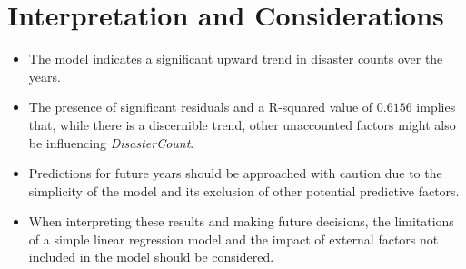 \documentclass[11pt]{article}\usepackage[]{graphicx}\usepackage[]{xcolor}
\begin{document}
\section*{Interpretation and Considerations}
\begin{itemize}
    \item The model indicates a significant upward trend in disaster counts over the years.
    \item The presence of significant residuals and a R-squared value of $0.6156$ implies that, while there is a discernible trend, other unaccounted factors might also be influencing \textit{DisasterCount}.
    \item Predictions for future years should be approached with caution due to the simplicity of the model and its exclusion of other potential predictive factors.
    \item When interpreting these results and making future decisions, the limitations of a simple linear regression model and the impact of external factors not included in the model should be considered.
\end{itemize}
\end{document}

